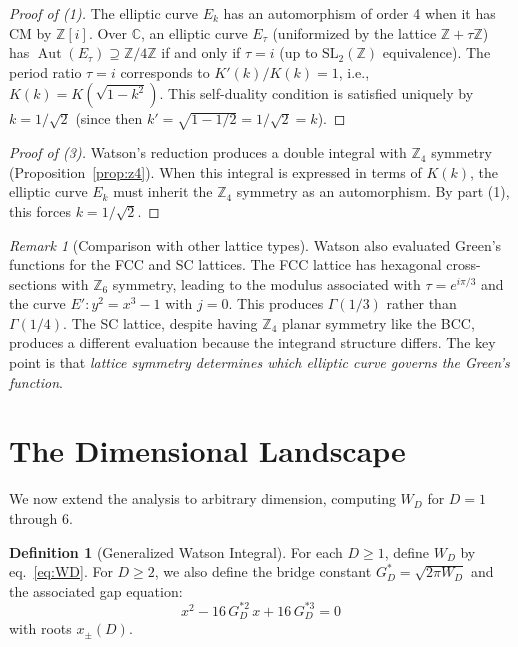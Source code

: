 \documentclass[12pt]{article}
\theoremstyle{definition}
\newtheorem{definition}[theorem]{Definition}
\theoremstyle{remark}
\newtheorem{remark}[theorem]{Remark}
\begin{document}
\begin{proof}[Proof of (1)]
The elliptic curve $E_k$ has an automorphism of order 4 when it has CM by $\mathbb{Z}[i]$. Over $\mathbb{C}$, an elliptic curve $E_\tau$ (uniformized by the lattice $\mathbb{Z} + \tau\mathbb{Z}$) has $\operatorname{Aut}(E_\tau) \supseteq \mathbb{Z}/4\mathbb{Z}$ if and only if $\tau = i$ (up to $\mathrm{SL}_2(\mathbb{Z})$ equivalence). The period ratio $\tau = i$ corresponds to $K'(k)/K(k) = 1$, i.e., $K(k) = K(\sqrt{1-k^2})$. This self-duality condition is satisfied uniquely by $k = 1/\sqrt{2}$ (since then $k' = \sqrt{1-1/2} = 1/\sqrt{2} = k$). \qedhere
\end{proof}

\begin{proof}[Proof of (3)]
Watson's reduction produces a double integral with $\mathbb{Z}_4$ symmetry (Proposition~\ref{prop:z4}). When this integral is expressed in terms of $K(k)$, the elliptic curve $E_k$ must inherit the $\mathbb{Z}_4$ symmetry as an automorphism. By part (1), this forces $k = 1/\sqrt{2}$.
\end{proof}

\begin{remark}[Comparison with other lattice types]
Watson also evaluated Green's functions for the FCC and SC lattices. The FCC lattice has hexagonal cross-sections with $\mathbb{Z}_6$ symmetry, leading to the modulus associated with $\tau = e^{i\pi/3}$ and the curve $E'\!: y^2 = x^3 - 1$ with $j = 0$. This produces $\Gamma(1/3)$ rather than $\Gamma(1/4)$. The SC lattice, despite having $\mathbb{Z}_4$ planar symmetry like the BCC, produces a different evaluation because the integrand structure differs. The key point is that \emph{lattice symmetry determines which elliptic curve governs the Green's function}.
\end{remark}

\section{The Dimensional Landscape}
\label{sec:dimensions}

We now extend the analysis to arbitrary dimension, computing $W_D$ for $D = 1$ through $6$.

\begin{definition}[Generalized Watson Integral]
For each $D \geq 1$, define $W_D$ by eq.~\eqref{eq:WD}. For $D \geq 2$, we also define the bridge constant $G^*_D = \sqrt{2\pi W_D}$ and the associated gap equation:
\begin{equation}
    x^2 - 16\,G_D^{*2}\,x + 16\,G_D^{*3} = 0
    \label{eq:gap-D}
\end{equation}
with roots $x_\pm(D)$.
\end{definition}
\end{document}
